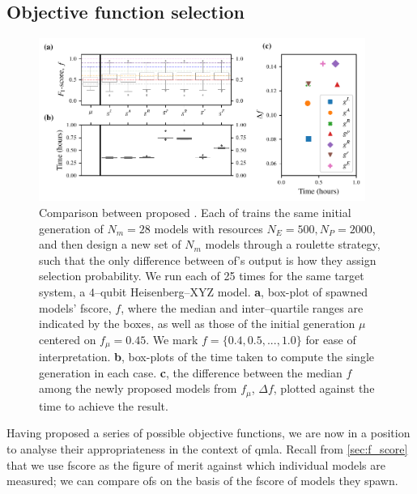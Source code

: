 {\subsection{Objective function selection}\label{sec:obj_fnc_selection}
\begin{figure}[t]
    \centering
    \includegraphics[width=0.95\textwidth]{theoretical_study/figures/objective_fnc_comparison.pdf}
    \caption[Comparison between proposed objective functions]{
        Comparison between proposed . 
        Each \gls{of} trains the same initial generation of $N_m=28$ models with resources
        $N_E=500, N_P=2000$, and then design a new set of $N_m$ models through 
        a roulette strategy, such that the only difference between \gls{of}'s output 
        is how they assign selection probability.
        We run each \gls{of} 25 times for the same target system, 
            a $4$--qubit Heisenberg--XYZ model. 
        \textbf{a}, box-plot of spawned models' \gls{fscore}, $f$, 
            where the median and inter--quartile ranges are indicated by the boxes,
            as well as those of the initial generation $\mu$ centered on $f_{\mu}=0.45$.
            We mark $f=\{0.4, 0.5, ..., 1.0\}$ for ease of interpretation. 
        \textbf{b}, box-plots of the time taken to compute the single generation in each case.
        \textbf{c}, the difference between the median $f$ among the 
            newly proposed models from $f_{\mu}$, $\Delta f$,
            plotted against the time to achieve the result. 
    }
    \label{fig:obj_fnc_comparison}
\end{figure}

Having proposed a series of possible objective functions, 
    we are now in a position to analyse their appropriateness in the context of \gls{qmla}. 
Recall from \cref{sec:f_score} that we use \gls{fscore} as the figure of merit against which individual models are measured;
    we can compare \glspl{of} on the basis of the \gls{fscore} of models they spawn.

}
